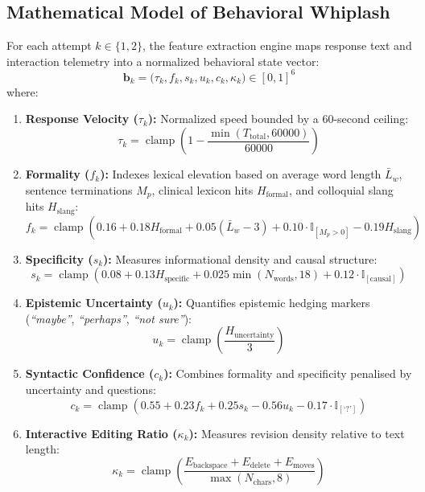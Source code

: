 \documentclass[10pt,a4paper]{article}
\begin{document}
\subsection*{Mathematical Model of Behavioral Whiplash}
For each attempt $k \in \{1, 2\}$, the feature extraction engine maps response text and interaction telemetry into a normalized behavioral state vector:
\begin{equation}
    \mathbf{b}_k = \big(\tau_k, f_k, s_k, u_k, c_k, \kappa_k\big) \in [0, 1]^6
\end{equation}
where:
\begin{enumerate}
    \item \textbf{Response Velocity ($\tau_k$):} Normalized speed bounded by a 60-second ceiling:
    \begin{equation}
        \tau_k = \operatorname{clamp}\left(1 - \frac{\min(T_{\text{total}}, 60000)}{60000}\right)
    \end{equation}
    \item \textbf{Formality ($f_k$):} Indexes lexical elevation based on average word length $\bar{L}_w$, sentence terminations $M_p$, clinical lexicon hits $H_{\text{formal}}$, and colloquial slang hits $H_{\text{slang}}$:
    \begin{equation}
        f_k = \operatorname{clamp}\left(0.16 + 0.18 H_{\text{formal}} + 0.05(\bar{L}_w - 3) + 0.10 \cdot \mathbb{I}_{[M_p > 0]} - 0.19 H_{\text{slang}}\right)
    \end{equation}
    \item \textbf{Specificity ($s_k$):} Measures informational density and causal structure:
    \begin{equation}
        s_k = \operatorname{clamp}\left(0.08 + 0.13 H_{\text{specific}} + 0.025 \min(N_{\text{words}}, 18) + 0.12 \cdot \mathbb{I}_{[\text{causal}]}\right)
    \end{equation}
    \item \textbf{Epistemic Uncertainty ($u_k$):} Quantifies epistemic hedging markers (\textit{``maybe''}, \textit{``perhaps''}, \textit{``not sure''}):
    \begin{equation}
        u_k = \operatorname{clamp}\left(\frac{H_{\text{uncertainty}}}{3}\right)
    \end{equation}
    \item \textbf{Syntactic Confidence ($c_k$):} Combines formality and specificity penalised by uncertainty and questions:
    \begin{equation}
        c_k = \operatorname{clamp}\left(0.55 + 0.23 f_k + 0.25 s_k - 0.56 u_k - 0.17 \cdot \mathbb{I}_{[\text{`?'}]}\right)
    \end{equation}
    \item \textbf{Interactive Editing Ratio ($\kappa_k$):} Measures revision density relative to text length:
    \begin{equation}
        \kappa_k = \operatorname{clamp}\left(\frac{E_{\text{backspace}} + E_{\text{delete}} + E_{\text{moves}}}{\max(N_{\text{chars}}, 8)}\right)
    \end{equation}
\end{enumerate}
\end{document}
